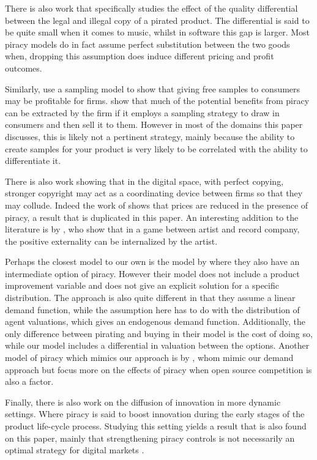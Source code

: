 \documentclass[12pt]{article}
\numberwithin{equation}{section}
\begin{document}
There is also work that specifically studies the effect of the quality differential between the legal and illegal copy of a pirated product\citep{GL03}. The differential is said to be quite small when it comes to music, whilst in software this gap is larger. Most piracy models do in fact assume perfect substitution between the two goods when, dropping this assumption does induce different pricing and profit outcomes.

Similarly, \cite{PW06b} use a sampling model to show that giving free samples to consumers may be profitable for firms. \cite{C05} show that much of the potential benefits from piracy can be extracted by the firm if it employs a sampling strategy to draw in consumers and then sell it to them. However in most of the domains this paper discusses, this is likely not a pertinent strategy, mainly because the ability to create samples for your product is very likely to be correlated with the ability to differentiate it.

There is also work showing that in the digital space, with perfect copying, stronger copyright may act as a coordinating device between firms so that they may collude\citep{J08}. Indeed the work of \cite{S04} shows that prices are reduced in the presence of piracy, a result that is duplicated in this paper. An interesting addition to the literature is by \cite{curien2009music}, who show that in a game between artist and record company, the positive externality can be internalized by the artist. 

Perhaps the closest model to our own is the model by \cite{CRP91} where they also have an intermediate option of piracy. However their model does not include a product improvement variable and does not give an explicit solution for a specific distribution. The approach is also quite different in that they assume a linear demand function, while the assumption here has to do with the distribution of agent valuations, which gives an endogenous demand function.  Additionally, the only difference between pirating and buying in their model is the cost of doing so, while our model includes a differential in valuation between the options. Another model of piracy which mimics our approach is by \cite{MRSS17}, whom mimic our demand approach but focus more on the effects of piracy when open source competition is also a factor.

Finally, there is also work on the diffusion of innovation in more dynamic settings. Where piracy is said to boost innovation during the early stages of the product life-cycle process. Studying this setting yields a result that is also found on this paper, mainly that strengthening piracy controls is not necessarily an optimal strategy for digital markets\citep{G03}  \citep{GMM95}. 
\end{document}
